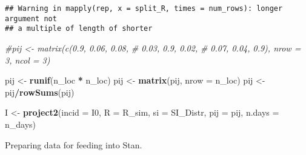 \documentclass[11pt,]{article}
\newenvironment{Shaded}{\begin{snugshade}}{\end{snugshade}}
\newcommand{\KeywordTok}[1]{\textcolor[rgb]{0.13,0.29,0.53}{\textbf{#1}}}
\newcommand{\DataTypeTok}[1]{\textcolor[rgb]{0.13,0.29,0.53}{#1}}
\newcommand{\StringTok}[1]{\textcolor[rgb]{0.31,0.60,0.02}{#1}}
\newcommand{\CommentTok}[1]{\textcolor[rgb]{0.56,0.35,0.01}{\textit{#1}}}
\newcommand{\OperatorTok}[1]{\textcolor[rgb]{0.81,0.36,0.00}{\textbf{#1}}}
\newcommand{\NormalTok}[1]{#1}
\begin{document}
\begin{verbatim}
## Warning in mapply(rep, x = split_R, times = num_rows): longer argument not
## a multiple of length of shorter
\end{verbatim}

\begin{Shaded}
\begin{Highlighting}[]
\CommentTok{#pij <- matrix(c(0.9, 0.06, 0.08,}
\CommentTok{#                0.03, 0.9, 0.02,}
\CommentTok{#                0.07, 0.04, 0.9), nrow = 3, ncol = 3)}

\NormalTok{pij <-}\StringTok{ }\KeywordTok{runif}\NormalTok{(n_loc }\OperatorTok{*}\StringTok{ }\NormalTok{n_loc)}
\NormalTok{pij <-}\StringTok{ }\KeywordTok{matrix}\NormalTok{(pij, }\DataTypeTok{nrow =}\NormalTok{ n_loc)}
\NormalTok{pij <-}\StringTok{ }\NormalTok{pij}\OperatorTok{/}\KeywordTok{rowSums}\NormalTok{(pij)}

\NormalTok{I <-}\StringTok{ }\KeywordTok{project2}\NormalTok{(}\DataTypeTok{incid =}\NormalTok{ I0, }\DataTypeTok{R =}\NormalTok{ R_sim, }\DataTypeTok{si =}\NormalTok{ SI_Distr,}
              \DataTypeTok{pij =}\NormalTok{ pij,}
              \DataTypeTok{n.days =}\NormalTok{ n_days)}
\end{Highlighting}
\end{Shaded}

Preparing data for feeding into Stan.
\end{document}
